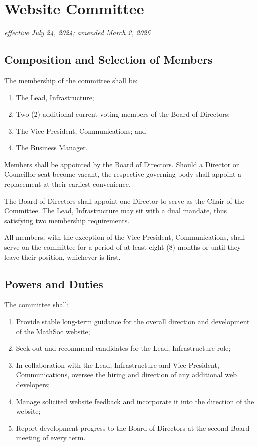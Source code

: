 \section{Website Committee}
\emph{effective July 24, 2024; amended March 2, 2026}\\

\subsection{Composition and Selection of Members}

The membership of the committee shall be:
\begin{enumerate}
  \item The Lead, Infrastructure;
	\item Two (2) additional current voting members of the Board of Directors;
	\item The Vice-President, Communications; and
	\item The Business Manager.
\end{enumerate}

Members shall be appointed by the Board of Directors. 
Should a Director or Councillor seat become vacant, the respective governing body shall appoint a replacement at their earliest convenience. 

The Board of Directors shall appoint one Director to serve as the Chair of the Committee.
The Lead, Infrastructure may sit with a dual mandate, thus satisfying two membership requirements.

All members, with the exception of the Vice-President, Communications, shall serve on the committee for a period of at least eight (8) months or until they leave their position, whichever is first.

\subsection{Powers and Duties}

The committee shall:

\begin{enumerate}
  \item Provide stable long-term guidance for the overall direction and development of the MathSoc website;
  \item Seek out and recommend candidates for the Lead, Infrastructure role;
  \item In collaboration with the Lead, Infrastructure and Vice President, Communications, oversee the hiring and direction of any additional web developers;
  \item Manage solicited website feedback and incorporate it into the direction of the website;
  \item Report development progress to the Board of Directors at the second Board meeting of every term.
\end{enumerate}

